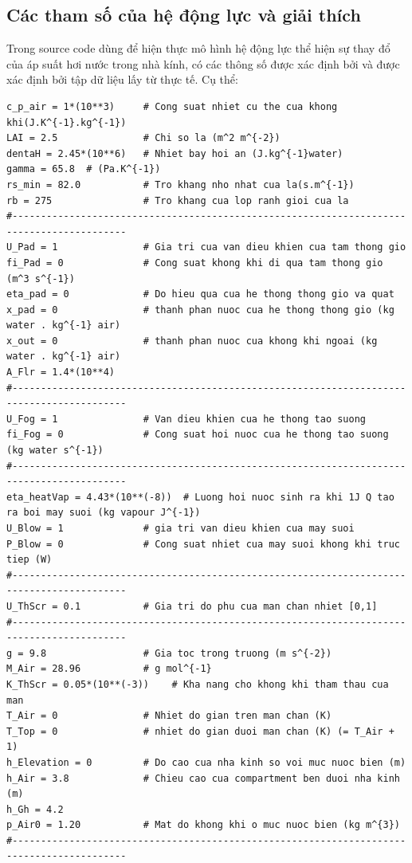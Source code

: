 \documentclass[13pt,a4paper]{article}
\begin{document}
	\subsection{Các tham số của hệ động lực và giải thích}
		Trong source code dùng để hiện thực mô hình hệ động lực thể hiện sự thay đổ của áp suất hơi nước trong nhà kính, có các thông số được xác định bởi \cite{Van11} và được xác định bởi tập dữ liệu lấy từ thực tế. Cụ thể:
\begin{lstlisting}
c_p_air = 1*(10**3)  	# Cong suat nhiet cu the cua khong khi(J.K^{-1}.kg^{-1})
LAI = 2.5  				# Chi so la (m^2 m^{-2})
dentaH = 2.45*(10**6)  	# Nhiet bay hoi an (J.kg^{-1}water)
gamma = 65.8  # (Pa.K^{-1})
rs_min = 82.0  			# Tro khang nho nhat cua la(s.m^{-1})
rb = 275  				# Tro khang cua lop ranh gioi cua la
#------------------------------------------------------------------------------------------
U_Pad = 1       		# Gia tri cua van dieu khien cua tam thong gio
fi_Pad = 0   			# Cong suat khong khi di qua tam thong gio (m^3 s^{-1})
eta_pad = 0  			# Do hieu qua cua he thong thong gio va quat
x_pad = 0  				# thanh phan nuoc cua he thong thong gio (kg water . kg^{-1} air)
x_out = 0  				# thanh phan nuoc cua khong khi ngoai (kg water . kg^{-1} air)
A_Flr = 1.4*(10**4)     
#------------------------------------------------------------------------------------------
U_Fog = 1   			# Van dieu khien cua he thong tao suong
fi_Fog = 0 				# Cong suat hoi nuoc cua he thong tao suong (kg water s^{-1})
#------------------------------------------------------------------------------------------
eta_heatVap = 4.43*(10**(-8))  # Luong hoi nuoc sinh ra khi 1J Q tao ra boi may suoi (kg vapour J^{-1})
U_Blow = 1    			# gia tri van dieu khien cua may suoi
P_Blow = 0     			# Cong suat nhiet cua may suoi khong khi truc tiep (W)
#------------------------------------------------------------------------------------------
U_ThScr = 0.1  			# Gia tri do phu cua man chan nhiet [0,1]
#------------------------------------------------------------------------------------------
g = 9.8                 # Gia toc trong truong (m s^{-2})
M_Air = 28.96           # g mol^{-1}
K_ThScr = 0.05*(10**(-3))    # Kha nang cho khong khi tham thau cua man 
T_Air = 0               # Nhiet do gian tren man chan (K)
T_Top = 0               # nhiet do gian duoi man chan (K) (= T_Air + 1)
h_Elevation = 0         # Do cao cua nha kinh so voi muc nuoc bien (m)
h_Air = 3.8             # Chieu cao cua compartment ben duoi nha kinh (m)
h_Gh = 4.2
p_Air0 = 1.20           # Mat do khong khi o muc nuoc bien (kg m^{3})
#------------------------------------------------------------------------------------------

\end{lstlisting}
\end{document}

